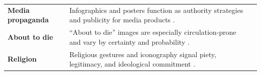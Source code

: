 \begin{longtable}{L{2.0cm} L{4.0cm} C{4.0cm}}
\textbf{Media propaganda} &
Infographics and posters function as authority strategies and publicity for media products \parencite{glausch2020a,abdelrahim2019a}. &
\hfill
{}\\
\addlinespace

\textbf{About to die} &
“About to die” images are especially circulation-prone and vary by certainty and probability \parencite{zelizer2010a,winkler2016a}. &
\hfill
{}\\
\addlinespace

\textbf{Religion} &
Religious gestures and iconography signal piety, legitimacy, and ideological commitment \parencite{winkler2022a,heck2017a}. &
\hfill
{}\\
\end{longtable}
